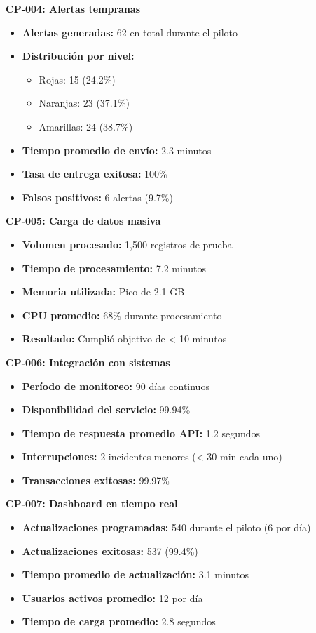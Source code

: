 \textbf{CP-004: Alertas tempranas}
\begin{itemize}
    \item \textbf{Alertas generadas:} 62 en total durante el piloto
    \item \textbf{Distribución por nivel:}
    \begin{itemize}
        \item Rojas: 15 (24.2\%)
        \item Naranjas: 23 (37.1\%)
        \item Amarillas: 24 (38.7\%)
    \end{itemize}
    \item \textbf{Tiempo promedio de envío:} 2.3 minutos
    \item \textbf{Tasa de entrega exitosa:} 100\%
    \item \textbf{Falsos positivos:} 6 alertas (9.7\%)
\end{itemize}

\textbf{CP-005: Carga de datos masiva}
\begin{itemize}
    \item \textbf{Volumen procesado:} 1,500 registros de prueba
    \item \textbf{Tiempo de procesamiento:} 7.2 minutos
    \item \textbf{Memoria utilizada:} Pico de 2.1 GB
    \item \textbf{CPU promedio:} 68\% durante procesamiento
    \item \textbf{Resultado:} Cumplió objetivo de < 10 minutos
\end{itemize}

\textbf{CP-006: Integración con sistemas}
\begin{itemize}
    \item \textbf{Período de monitoreo:} 90 días continuos
    \item \textbf{Disponibilidad del servicio:} 99.94\%
    \item \textbf{Tiempo de respuesta promedio API:} 1.2 segundos
    \item \textbf{Interrupciones:} 2 incidentes menores (< 30 min cada uno)
    \item \textbf{Transacciones exitosas:} 99.97\%
\end{itemize}

\textbf{CP-007: Dashboard en tiempo real}
\begin{itemize}
    \item \textbf{Actualizaciones programadas:} 540 durante el piloto (6 por día)
    \item \textbf{Actualizaciones exitosas:} 537 (99.4\%)
    \item \textbf{Tiempo promedio de actualización:} 3.1 minutos
    \item \textbf{Usuarios activos promedio:} 12 por día
    \item \textbf{Tiempo de carga promedio:} 2.8 segundos
\end{itemize}

